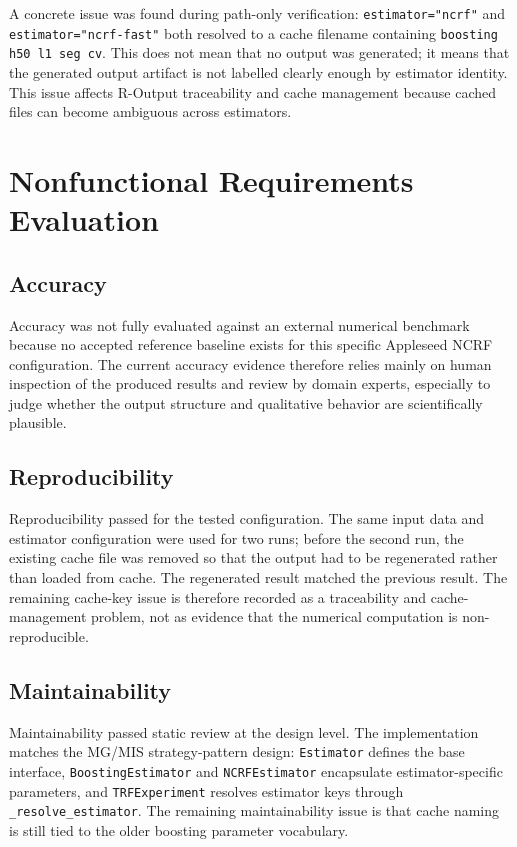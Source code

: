\documentclass[12pt, titlepage]{article}
\begin{document}
A concrete issue was found during path-only verification: \texttt{estimator="ncrf"} and \texttt{estimator="ncrf-fast"} both resolved to a cache filename containing \texttt{boosting h50 l1 seg cv}. This does not mean that no output was generated; it means that the generated output artifact is not labelled clearly enough by estimator identity. This issue affects R-Output traceability and cache management because cached files can become ambiguous across estimators.

\section{Nonfunctional Requirements Evaluation}

\subsection{Accuracy}

Accuracy was not fully evaluated against an external numerical benchmark because no accepted reference baseline exists for this specific Appleseed NCRF configuration. The current accuracy evidence therefore relies mainly on human inspection of the produced results and review by domain experts, especially to judge whether the output structure and qualitative behavior are scientifically plausible.
\subsection{Reproducibility}

Reproducibility passed for the tested configuration. The same input data and estimator configuration were used for two runs; before the second run, the existing cache file was removed so that the output had to be regenerated rather than loaded from cache. The regenerated result matched the previous result. The remaining cache-key issue is therefore recorded as a traceability and cache-management problem, not as evidence that the numerical computation is non-reproducible.

\subsection{Maintainability}

Maintainability passed static review at the design level. The implementation matches the MG/MIS strategy-pattern design: \texttt{Estimator} defines the base interface, \texttt{BoostingEstimator} and \texttt{NCRFEstimator} encapsulate estimator-specific parameters, and \texttt{TRFExperiment} resolves estimator keys through \texttt{\_resolve\_estimator}. The remaining maintainability issue is that cache naming is still tied to the older boosting parameter vocabulary.
\end{document}
